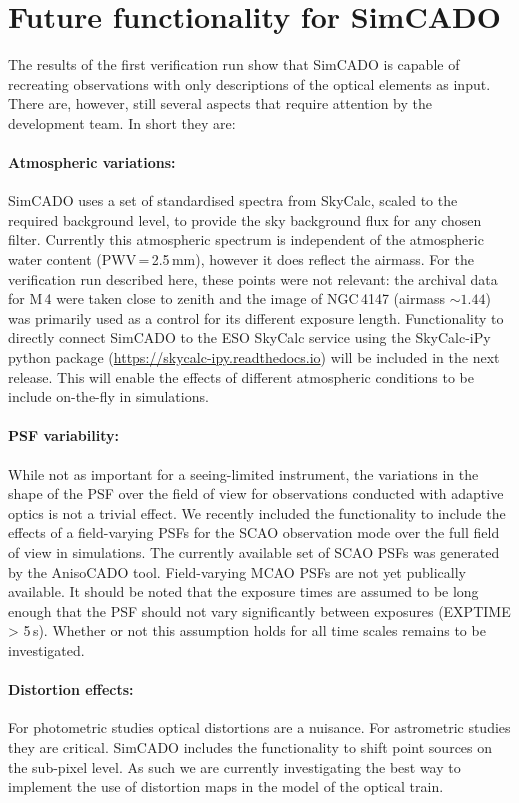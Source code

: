 \section{Future functionality for SimCADO}
\label{sec:future}

The results of the first verification run show that SimCADO is capable of recreating observations with only descriptions of the optical elements as input. There are, however, still several aspects that require attention by the development team. In short they are:

\paragraph{Atmospheric variations:} SimCADO uses a set of standardised spectra from SkyCalc, scaled to the required background level, to provide the sky background flux for any chosen filter. Currently this atmospheric spectrum is independent of the atmospheric water content (PWV\,=\,2.5\,mm), however it does reflect the airmass. For the verification run described here, these points were not relevant: the archival data for M\,4 were taken close to zenith and the image of NGC\,4147 (airmass $\sim 1.44$) was primarily used as a control for its different exposure length. Functionality to directly connect SimCADO to the ESO SkyCalc service using the SkyCalc-iPy python package (\url{https://skycalc-ipy.readthedocs.io}) will be included in the next release. This will enable the effects of different atmospheric conditions to be include on-the-fly in simulations.

\paragraph{PSF variability:} While not as important for a seeing-limited instrument, the variations in the shape of the PSF over the field of view for observations conducted with adaptive optics is not a trivial effect. We recently included the functionality to include the effects of a field-varying PSFs for the SCAO observation mode over the full field of view in simulations. The currently available set of SCAO PSFs was generated by the AnisoCADO tool. Field-varying MCAO PSFs are not yet publically available. It should be noted that the exposure times are assumed to be long enough that the PSF should not vary significantly between exposures (EXPTIME > 5\,s). Whether or not this assumption holds for all time scales remains to be investigated.

\paragraph{Distortion effects:} For photometric studies optical distortions are a nuisance. For astrometric studies they are critical. SimCADO includes the functionality to shift point sources on the sub-pixel level. As such we are currently investigating the best way to implement the use of distortion maps in the model of the optical train.

